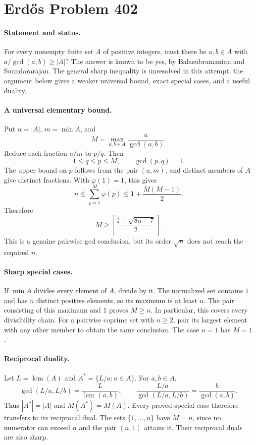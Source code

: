 \section*{Erd\H{o}s Problem 402}

\paragraph{Statement and status.}
For every nonempty finite set \(A\) of positive integers, must there be
\(a,b\in A\) with \(a/\gcd(a,b)\geq |A|\)?
The answer is known to be yes, by Balasubramanian and Soundararajan.
The general sharp inequality is unresolved in this attempt; the argument
below gives a weaker universal bound, exact special cases, and a useful
duality.

\paragraph{A universal elementary bound.}
Put \(n=|A|\), \(m=\min A\), and
\[
 M=\max_{a,b\in A}\frac{a}{\gcd(a,b)}.
\]
Reduce each fraction \(a/m\) to \(p/q\). Then
\[
 1\leq q\leq p\leq M,\qquad \gcd(p,q)=1.
\]
The upper bound on \(p\) follows from the pair \((a,m)\), and distinct
members of \(A\) give distinct fractions. With \(\varphi(1)=1\), this gives
\[
 n\leq\sum_{p=1}^{M}\varphi(p)
 \leq1+\frac{M(M-1)}2.
\]
Therefore
\[
 M\geq
 \left\lceil\frac{1+\sqrt{8n-7}}2\right\rceil .
 \tag{1}
\]
This is a genuine pairwise gcd conclusion, but its order \(\sqrt n\)
does not reach the required \(n\).

\paragraph{Sharp special cases.}
If \(\min A\) divides every element of \(A\), divide by it. The normalized
set contains \(1\) and has \(n\) distinct positive elements, so its maximum
is at least \(n\). The pair consisting of this maximum and \(1\) proves
\(M\geq n\). In particular, this covers every divisibility chain.
For a pairwise coprime set with \(n\geq2\), pair its largest element
with any other member to obtain the same conclusion. The case \(n=1\)
has \(M=1\).

\paragraph{Reciprocal duality.}
Let \(L=\operatorname{lcm}(A)\) and \(A^*=\{L/a:a\in A\}\).
For \(a,b\in A\),
\[
 \gcd(L/a,L/b)=\frac{L}{\operatorname{lcm}(a,b)},\qquad
 \frac{L/a}{\gcd(L/a,L/b)}=\frac{b}{\gcd(a,b)}.
\]
Thus \(|A^*|=|A|\) and \(M(A^*)=M(A)\). Every proved special case
therefore transfers to its reciprocal dual. The sets
\(\{1,\ldots,n\}\) have \(M=n\), since no numerator can exceed \(n\)
and the pair \((n,1)\) attains it. Their reciprocal duals are also sharp.

